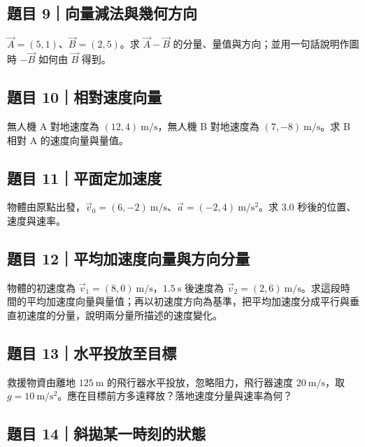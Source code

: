 \documentclass[11pt,a4paper]{article}
\begin{document}
\subsection{題目 9｜向量減法與幾何方向}\label{ux984cux76ee-9ux5411ux91cfux6e1bux6cd5ux8207ux5e7eux4f55ux65b9ux5411}

\(\vec A=(5,1)\)、\(\vec B=(2,5)\)。求 \(\vec A-\vec B\) 的分量、量值與方向；並用一句話說明作圖時 \(-\vec B\) 如何由 \(\vec B\) 得到。

\subsection{題目 10｜相對速度向量}\label{ux984cux76ee-10ux76f8ux5c0dux901fux5ea6ux5411ux91cf}

無人機 A 對地速度為 \((12,4)\ \mathrm{m/s}\)，無人機 B 對地速度為 \((7,-8)\ \mathrm{m/s}\)。求 B 相對 A 的速度向量與量值。

\subsection{題目 11｜平面定加速度}\label{ux984cux76ee-11ux5e73ux9762ux5b9aux52a0ux901fux5ea6}

物體由原點出發，\(\vec v_0=(6,-2)\ \mathrm{m/s}\)、\(\vec a=(-2,4)\ \mathrm{m/s^2}\)。求 3.0 秒後的位置、速度與速率。

\subsection{題目 12｜平均加速度向量與方向分量}\label{ux984cux76ee-12ux5e73ux5747ux52a0ux901fux5ea6ux5411ux91cfux8207ux65b9ux5411ux5206ux91cf}

物體的初速度為 \(\vec v_1=(8,0)\ \mathrm{m/s}\)，\(1.5\ \mathrm s\) 後速度為 \(\vec v_2=(2,6)\ \mathrm{m/s}\)。求這段時間的平均加速度向量與量值；再以初速度方向為基準，把平均加速度分成平行與垂直初速度的分量，說明兩分量所描述的速度變化。

\subsection{題目 13｜水平投放至目標}\label{ux984cux76ee-13ux6c34ux5e73ux6295ux653eux81f3ux76eeux6a19}

救援物資由離地 \(125\ \mathrm m\) 的飛行器水平投放，忽略阻力，飛行器速度 \(20\ \mathrm{m/s}\)，取 \(g=10\ \mathrm{m/s^2}\)。應在目標前方多遠釋放？落地速度分量與速率為何？

\subsection{題目 14｜斜拋某一時刻的狀態}\label{ux984cux76ee-14ux659cux62cbux67d0ux4e00ux6642ux523bux7684ux72c0ux614b}
\end{document}
